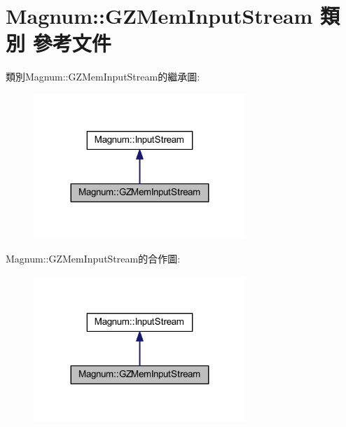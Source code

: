 \hypertarget{class_magnum_1_1_g_z_mem_input_stream}{}\section{Magnum\+:\+:G\+Z\+Mem\+Input\+Stream 類別 參考文件}
\label{class_magnum_1_1_g_z_mem_input_stream}


類別\+Magnum\+:\+:G\+Z\+Mem\+Input\+Stream的繼承圖\+:\nopagebreak
\begin{figure}[H]
\begin{center}
\leavevmode
\includegraphics[width=227pt]{class_magnum_1_1_g_z_mem_input_stream__inherit__graph}
\end{center}
\end{figure}


Magnum\+:\+:G\+Z\+Mem\+Input\+Stream的合作圖\+:\nopagebreak
\begin{figure}[H]
\begin{center}
\leavevmode
\includegraphics[width=227pt]{class_magnum_1_1_g_z_mem_input_stream__coll__graph}
\end{center}
\end{figure}
